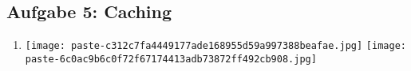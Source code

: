 \documentclass[12pt,a4paper]{article}
\begin{document}
\subsection*{Aufgabe 5: Caching}

\begin{enumerate}[label=\alph*), topsep=5pt, itemsep=10pt]
\item \mbox{}\begin{center}\texttt{[image: paste-c312c7fa4449177ade168955d59a997388beafae.jpg]}
\texttt{[image: paste-6c0ac9b6c0f72f67174413adb73872ff492cb908.jpg]}
\end{center}
\end{enumerate}
\clearpage
\end{document}
